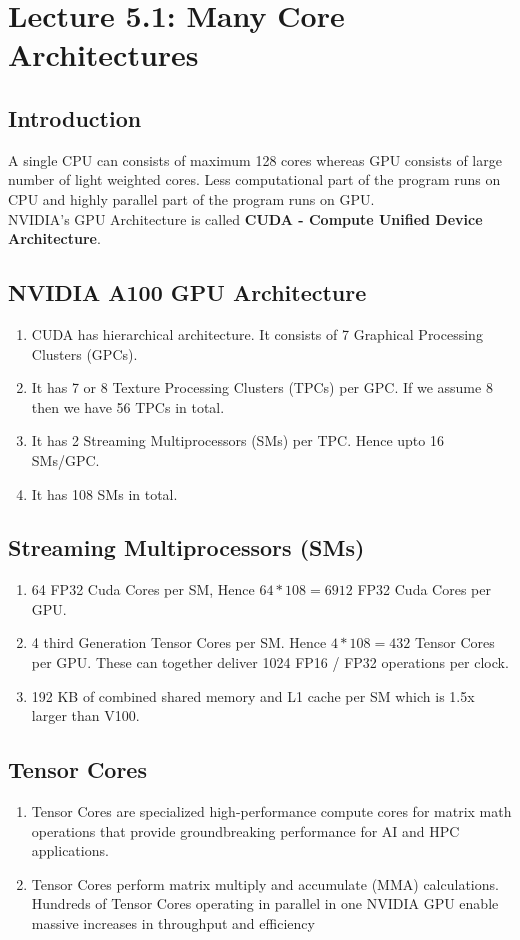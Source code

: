 \section*{Lecture 5.1: Many Core Architectures}

\subsection*{Introduction}
A single CPU can consists of maximum 128 cores whereas GPU consists of large number of light weighted cores. Less computational part of the program runs on CPU and highly parallel part of the program runs on GPU. \\
NVIDIA's GPU Architecture is called \textbf{CUDA - Compute Unified Device Architecture}.

\subsection*{NVIDIA A100 GPU Architecture} 
\begin{enumerate}
    \item CUDA has hierarchical architecture. It consists of 7 Graphical Processing Clusters (GPCs).
    \item It has 7 or 8 Texture Processing Clusters (TPCs) per GPC. If we assume 8 then we have 56 TPCs in total.
    \item It has 2 Streaming Multiprocessors (SMs) per TPC. Hence upto 16 SMs/GPC.
    \item It has 108 SMs in total.
\end{enumerate}

\subsection*{Streaming Multiprocessors (SMs)}
\begin{enumerate}
    \item 64 FP32 Cuda Cores per SM, Hence $64 * 108 = 6912$ FP32 Cuda Cores per GPU.
    \item 4 third Generation Tensor Cores per SM. Hence $4 * 108 = 432$ Tensor Cores per GPU. These can together deliver 1024 FP16 / FP32 operations per clock.
    \item 192 KB of combined shared memory and L1 cache per SM which is 1.5x larger than V100.
\end{enumerate}

\subsection*{Tensor Cores}
\begin{enumerate}
    \item Tensor Cores are specialized high-performance compute cores for matrix math operations that provide groundbreaking performance for AI and HPC applications. 
    \item Tensor Cores perform matrix
    multiply and accumulate (MMA) calculations. Hundreds of Tensor Cores operating in parallel in one NVIDIA GPU enable massive increases in throughput and efficiency
\end{enumerate}

